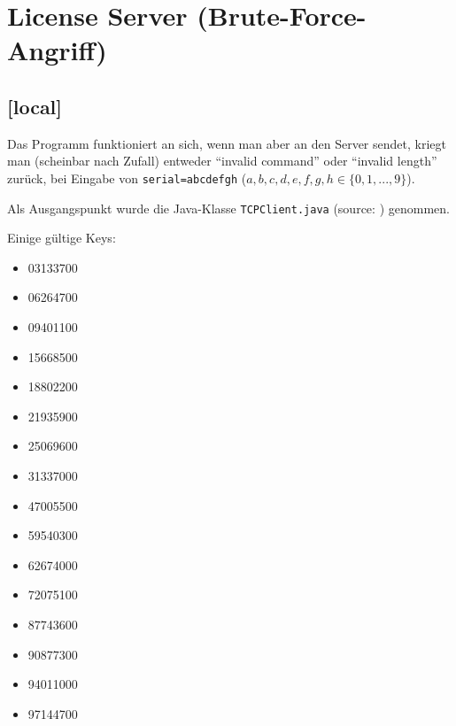 \documentclass[twoside]{article}
\newcommand{\say}[1]{%
	``#1''%
}
\newcommand{\ttt}[1]{%
	\texttt{#1}%
}
\begin{document}
\section{License Server (Brute-Force-Angriff)}
\subsection{[local]}
Das Programm funktioniert an sich, wenn man aber an den Server sendet, kriegt man (scheinbar nach Zufall) entweder \say{invalid command} oder \say{invalid length} zurück, bei Eingabe von \ttt{serial=abcdefgh} ($a,b,c,d,e,f,g,h \in \{0,1,...,9\}$).

Als Ausgangspunkt wurde die Java-Klasse \ttt{TCPClient.java} (source: \cite{javatcp}) genommen.

Einige gültige Keys:\\
\begin{center}
\begin{minipage}[t]{0.23\textwidth}
	\begin{itemize}
		\item 03133700
		\item 06264700
		\item 09401100
		\item 15668500
	\end{itemize}
\end{minipage}
\begin{minipage}[t]{0.23\textwidth}
	\begin{itemize}
		\item 18802200
		\item 21935900
		\item 25069600
		\item 31337000
	\end{itemize}
\end{minipage}
\begin{minipage}[t]{0.23\textwidth}
	\begin{itemize}
		\item 47005500
		\item 59540300
		\item 62674000
		\item 72075100
	\end{itemize}
\end{minipage}
\begin{minipage}[t]{0.23\textwidth}
	\begin{itemize}
		\item 87743600
		\item 90877300
		\item 94011000
		\item 97144700
	\end{itemize}
\end{minipage}
\end{center}
\end{document}
